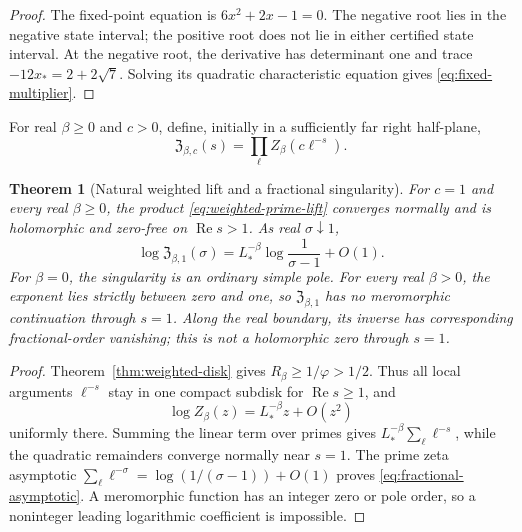 \documentclass[11pt]{article}
\numberwithin{equation}{section}
\newtheorem{theorem}{Theorem}[section]
\theoremstyle{remark}
\newcommand{\RePart}{\operatorname{Re}}
\begin{document}
\begin{proof}
The fixed-point equation is \(6x^2+2x-1=0\).  The negative root lies in the
negative state interval; the positive root does not lie in either certified
state interval.  At the negative root, the derivative has determinant one and
trace \(-12x_*=2+2\sqrt7\).  Solving its quadratic characteristic equation
gives \eqref{eq:fixed-multiplier}.
\end{proof}

For real \(\beta\ge0\) and \(c>0\), define, initially in a sufficiently far
right half-plane,
\begin{equation}
 \mathfrak Z_{\beta,c}(s)
 =\prod_{\ell}Z_\beta(c\ell^{-s}).
 \label{eq:weighted-prime-lift}
\end{equation}

\begin{theorem}[Natural weighted lift and a fractional singularity]
\label{thm:fractional}
For \(c=1\) and every real \(\beta\ge0\), the product
\eqref{eq:weighted-prime-lift} converges normally and is holomorphic and
zero-free on \(\RePart s>1\).  As real \(\sigma\downarrow1\),
\begin{equation}
 \log\mathfrak Z_{\beta,1}(\sigma)
 =L_*^{-\beta}\log\frac1{\sigma-1}+O(1).
 \label{eq:fractional-asymptotic}
\end{equation}
For \(\beta=0\), the singularity is an ordinary simple pole.  For every real
\(\beta>0\), the exponent lies strictly between zero and one, so
\(\mathfrak Z_{\beta,1}\) has no meromorphic continuation through \(s=1\).
Along the real boundary, its inverse has corresponding fractional-order
vanishing; this is not a holomorphic zero through \(s=1\).
\end{theorem}

\begin{proof}
Theorem~\ref{thm:weighted-disk} gives
\(
R_\beta\ge1/\varphi>1/2
\).  Thus all local arguments \(\ell^{-s}\) stay in one compact subdisk for
\(\RePart s\ge1\), and
\begin{equation}
 \log Z_\beta(z)=L_*^{-\beta}z+O(z^2)
 \label{eq:local-fixed-expansion}
\end{equation}
uniformly there.  Summing the linear term over primes gives
\(
L_*^{-\beta}\sum_\ell\ell^{-s}
\), while the quadratic remainders converge normally near \(s=1\).  The
prime zeta asymptotic \citep{Tenenbaum2015}
\(
\sum_\ell\ell^{-\sigma}=\log(1/(\sigma-1))+O(1)
\)
proves \eqref{eq:fractional-asymptotic}.  A meromorphic function has an
integer zero or pole order, so a noninteger leading logarithmic coefficient
is impossible.
\end{proof}
\end{document}
